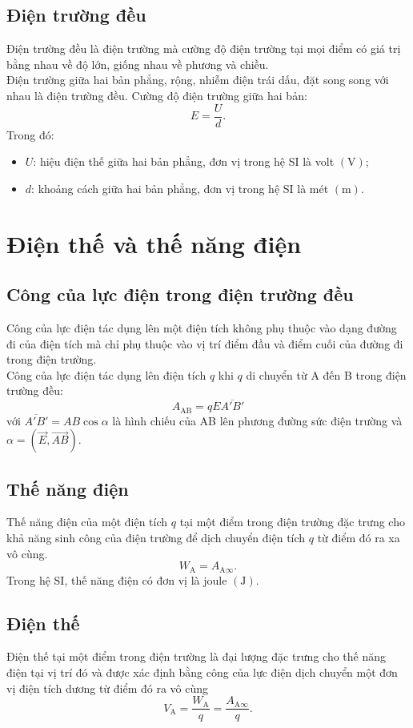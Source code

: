 \subsection{Điện trường đều}
Điện trường đều là điện trường mà cường độ điện trường tại mọi điểm có giá trị bằng nhau về độ lớn, giống nhau về phương và chiều.\\
Điện trường giữa hai bản phẳng, rộng, nhiễm điện trái dấu, đặt song song với nhau là điện trường đều. Cường độ điện trường giữa hai bản:
$$E=\dfrac{U}{d}.$$
Trong đó:
\begin{itemize}
	\item $U$: hiệu điện thế giữa hai bản phẳng, đơn vị trong hệ SI là volt $\left(\si{\volt}\right)$;
	\item $d$: khoảng cách giữa hai bản phẳng, đơn vị trong hệ SI là mét $\left(\si{\meter}\right)$.
\end{itemize}
\section{Điện thế và thế năng điện}
\subsection{Công của lực điện trong điện trường đều}
Công của lực điện tác dụng lên một điện tích không phụ thuộc vào dạng đường đi của điện tích mà chỉ phụ thuộc vào vị trí điểm đầu và điểm cuối của đường đi trong điện trường.\\
Công của lực điện tác dụng lên điện tích $q$ khi $q$ di chuyển từ A đến B trong điện trường đều:
$$A_\text{AB}=qE\overline{A'B'}$$
với $\overline{A'B'}=AB\cos\alpha$ là hình chiếu của AB lên phương đường sức điện trường và $\alpha=\left(\vec{E}, \overrightarrow{AB}\right).$
\subsection{Thế năng điện}
Thế năng điện của một điện tích $q$ tại một điểm trong điện trường đặc trưng cho khả năng sinh công của điện trường để dịch chuyển điện tích $q$ từ điểm đó ra xa vô cùng.
$$W_\text{A}=A_{\text{A}\infty}.$$
Trong hệ SI, thế năng điện có đơn vị là joule $\left(\si{\joule}\right).$
\subsection{Điện thế}
Điện thế tại một điểm trong điện trường là đại lượng đặc trưng cho thế năng điện tại vị trí đó và được xác định bằng công của lực điện dịch chuyển một đơn vị điện tích dương từ điểm đó ra vô cùng
$$V_\text{A}=\dfrac{W_\text{A}}{q}=\dfrac{A_{\text{A}\infty}}{q}.$$

